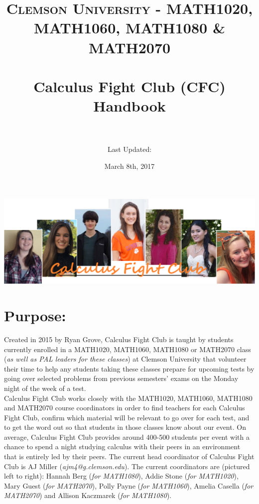 \documentclass[paper=a4, fontsize=11pt]{scrartcl} %
\title{	
\normalfont \normalsize 
\textsc{Clemson University - MATH1020, MATH1060, MATH1080 \& MATH2070} \\ [25pt] %
\horrule{0.5pt} \\[0.4cm] %
\huge Calculus Fight Club (CFC) Handbook \\ %
\horrule{2pt} \\[0.5cm] %
}
\author{Last Updated:} %
\date{\normalsize March 8th, 2017} %
\numberwithin{equation}{section} %
\numberwithin{figure}{section} %
\numberwithin{table}{section} %
\begin{document}
\maketitle %

\begin{center}
\includegraphics[scale=.5]{cfc.png}
\end{center}



\section*{\textbf{Purpose:}}

Created in 2015 by Ryan Grove, Calculus Fight Club is taught by students currently enrolled in a MATH1020, MATH1060, MATH1080 or MATH2070 class (\textit{as well as PAL leaders for these classes}) at Clemson University that volunteer their time to help any students taking these classes prepare for upcoming tests by going over selected problems from previous semesters' exams on the Monday night of the week of a test. \\

Calculus Fight Club works closely with the MATH1020, MATH1060, MATH1080 and MATH2070 course coordinators in order to find teachers for each Calculus Fight Club, confirm which material will be relevant to go over for each test, and to get the word out so that students in those classes know about our event.  On average, Calculus Fight Club provides around 400-500 students per event with a chance to spend a night studying calculus with their peers in an environment that is entirely led by their peers.  The current head coordinator of Calculus Fight Club is AJ Miller (\textit{ajm4@g.clemson.edu}).  The current coordinators are (pictured left to right):  Hannah Berg (\textit{for MATH1080}), Addie Stone (\textit{for MATH1020}), Mary Guest (\textit{for MATH2070}), Polly Payne (\textit{for MATH1060}), Amelia Casella (\textit{for MATH2070}) and Allison Kaczmarek (\textit{for MATH1080}).
\end{document}
